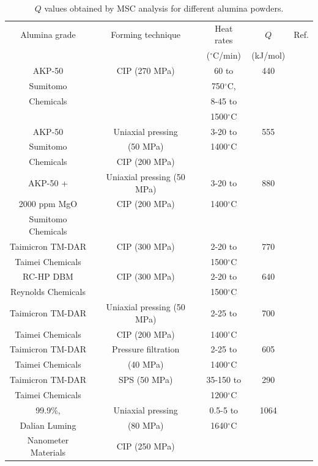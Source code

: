 \newpage
\begin{table}[H]
	\caption{$Q$ values obtained by MSC analysis for different alumina powders.}
	\centering
	\begin{tabular}{ | c | c | c | c | c | }
		\hline
		Alumina grade & Forming technique & Heat rates & $Q$ & Ref.\\
		& & ($^{\circ}$C/min) & (kJ/mol) & \\
		\hline
		AKP-50 & CIP (270 MPa) & 60 to & 440 & \cite{Su1996a}\\
		Sumitomo & & 750$^{\circ}$C, & & \\
		Chemicals & & 8-45 to & & \\ 
		& & 1500$^{\circ}$C & & \\
		\hline
		AKP-50 & Uniaxial pressing & 3-20 to & 555 & \cite{Tatami2006} \\
		Sumitomo & (50 MPa) & 1400$^{\circ}$C & & \\
		Chemicals & CIP (200 MPa) & & & \\
		\hline
		AKP-50 +  & Uniaxial pressing (50 MPa) & 3-20 to & 880 & \cite{Tatami2006} \\
		2000 ppm MgO & CIP (200 MPa) & 1400$^{\circ}$C & & \\
		Sumitomo Chemicals & & & & \\
		\hline
		Taimicron TM-DAR & CIP (300 MPa) & 2-20 to & 770 & \cite{Pouchly2009}\\
		Taimei Chemicals & & 1500$^{\circ}$C & & \\
		\hline
		RC-HP DBM & CIP (300 MPa) & 2-20 to & 640 & \cite{Pouchly2009}\\
		Reynolds Chemicals & & 1500$^{\circ}$C & & \\
		\hline
		Taimicron TM-DAR & Uniaxial pressing (50 MPa) & 2-25 to & 700 & \cite{Aminzare2010}\\
		Taimei Chemicals & CIP (200 MPa) & 1400$^{\circ}$C & & \\
		\hline
		Taimicron TM-DAR & Pressure filtration & 2-25 to & 605 & \cite{Aminzare2010}\\
		Taimei Chemicals & (40 MPa) & 1400$^{\circ}$C & & \\
		\hline
		Taimicron TM-DAR & SPS (50 MPa) & 35-150 to & 290 & \cite{Guillon2010}\\
		Taimei Chemicals & & 1200$^{\circ}$C & & \\
		\hline
		99.9\%, & Uniaxial pressing & 0.5-5 to & 1064 & \cite{Shao2009}\\
		Dalian Luming & (80 MPa) & 1640$^{\circ}$C & & \\
		Nanometer Materials & CIP (250 MPa) & & & \\
		\hline
	\end{tabular}
	\label{Ch6-table:table1}
\end{table}

